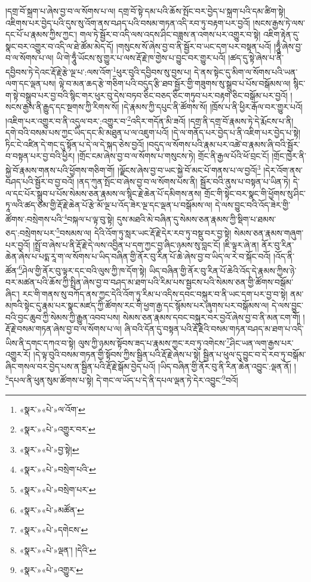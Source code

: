 །དགྲ་བོ་སྐྲག་པ་ཞེས་བྱ་བ་ལ་སོགས་པ་ལ། དགྲ་བོ་སྟེ་དམ་པའི་ཆོས་སྤོང་བར་བྱེད་པ་སྐྲག་པའི་དམ་ཚིག་སྟེ། འཇིགས་པར་བྱེད་པའི་དུས་སུ་འོག་ནས་བཤད་པའི་བསམ་གཏན་འདི་རབ་ཏུ་བརྟག་པར་བྱའོ། །སངས་རྒྱས་ཏེ་ལས་དང་པོ་པ་རྣམས་ཀྱིས་ཀྱང་། གལ་ཏེ་སྦྱོར་བ་འདི་ལས་འདས་ཤིང་བཟླས་ན་འགས་པར་འགྱུར་བ་སྟེ། འཇིག་རྟེན་དུ་སྣང་བར་འགྱུར་བ་འདི་ལ་ཐེ་ཚོམ་མེད་དོ། །གསུངས་སོ་ཞེས་བྱ་བ་ནི་སྦྱོར་བ་ཡང་དག་པར་བསྟན་པའོ། །ཧཱུྃ་ཞེས་བྱ་བ་ལ་སོགས་པ་ལ། ཡི་གེ་ཧཱུྃ་ཡོངས་སུ་གྱུར་པ་ལས་རྡོ་རྗེ་ཁ་གྱེས་པ་བྱུང་བར་གྱུར་པའོ། །ཚད་དུ་སྟེ་ཞེས་པ་ནི་དབྱིབས་ཏེ་དེའང་རྡོ་རྗེ་རྩེ་ལྔ་པ་:ལས་འོག་\footnote{«སྣར་»«པེ་»ལ་འོག་}ཕུར་བུའི་དབྱིབས་སུ་བྱས་པ། དེ་ནས་སྟེང་དུ་མིག་ལ་སོགས་པའི་ཡན་ལག་དང་ལྡན་པས། ལྟེ་བ་མན་ཆད་རྩེ་གཅིག་པའི་བདུད་རྩི་ཐབ་སྦྱོར་གྱི་གཟུགས་སུ་སྒྲུབ་པ་པོས་བསྒོམས་ལ། སྙིང་ག་སྟེ་བསྒྲུབ་པར་བྱ་བའི་སྙིང་གར་ཕུར་བུ་དེས་བཏབ་ཅིང་བཅད་ཅིང་གཏུབ་པར་བརྟག་ཅིང་བསྒོམ་པར་བྱའོ། །སངས་རྒྱས་ནི་རྒྱུད་དང་སྔགས་ཀྱི་རིགས་སོ། །དེ་རྣམས་ཀྱི་དཔུང་ནི་ཚོགས་སོ། །ཁྲོས་པ་ནི་ཕྱིར་རྒོལ་བར་གྱུར་པའོ། །འཇིག་པར་འགྱུར་བ་ནི་འདུལ་བར་:འགྱུར་བ་\footnote{«སྣར་»«པེ་»འགྱུར་བར་}འདིར་གདོན་མི་ཟའོ། །དགྲ་ནི་དགྲ་བོ་རྣམས་ཏེ་དེ་རྨོངས་པ་ནི། དགེ་བའི་བསམ་པས་ཀྱང་ཡིད་དང་མི་མཐུན་པ་ལ་འཇུག་པའོ། །དེ་ལ་གནོད་པར་བྱེད་པ་ནི་འཇིག་པར་བྱེད་པ་སྟེ། ཏིང་ངེ་འཛིན་དེ་གང་དུ་སྟོན་པ་དེ་ལ་དེ་སྐད་ཅེས་བྱའོ། །བདུད་ལ་སོགས་པའི་རྣམ་པར་འཚེ་བ་རྣམས་ཞི་བའི་སྦྱོར་བ་བསྟན་པར་བྱ་བའི་ཕྱིར། །གྲོང་ངམ་ཞེས་བྱ་བ་ལ་སོགས་པ་གསུངས་ཏེ། གྲོང་ནི་རྒྱལ་པོའི་ཕོ་བྲང་ངོ། །གྲོང་ཁྱེར་ནི་སྐྱེ་བོ་རྣམས་གནས་པའི་ཕྱོགས་གཅིག་གོ། །ལྗོངས་ཞེས་བྱ་བ་ཡང་སྐྱེ་བོ་མང་པོ་གནས་པ་ལ་བྱའོ།\footnote{«སྣར་»«པེ་»བྱ་སྟེ།} །དེར་འོག་ནས་བཤད་པའི་སྦྱོར་བ་བྱ་བའོ། །ནད་ཀུན་སྤོང་བ་ཞེས་བྱ་བ་ལ་སོགས་པས་ནི། སྦྱོར་བའི་ནུས་པ་བསྟན་པ་ཡིན་ཏེ། དེ་ལ་དང་པོར་སྒྲུབ་པ་པོས་སེམས་ཅན་རྣམས་ལ་སྙིང་རྗེ་ཆེན་པོ་དམིགས་ནས། གྲོང་གི་སྟེང་བར་སྣང་གི་ཕྱོགས་སུ་ཤིང་ཏཱ་ལའི་ཚད་ཙམ་གྱི་རྡོ་རྗེ་ཆེན་པོ་རྩེ་མོ་ལྔ་པ་འོད་ཟེར་ལྔ་དང་ལྡན་པ་བསྒོམས་ལ། དེ་ལས་བྱུང་བའི་འོད་ཟེར་གྱི་ཚོགས་:བསྲེགས་པའི་\footnote{«སྣར་»«པེ་»བསྲེག་པའི་}བསྐལ་པ་ལྟ་བུ་སྟེ། དུས་མཐའི་མེ་བཞིན་དུ་སེམས་ཅན་རྣམས་ཀྱི་སྡིག་པ་ཐམས་ཅད་:བསྲེགས་པར་\footnote{«སྣར་»«པེ་»བསྲེག་པར་}བསམས་ལ། དེའི་འོག་ཏུ་སླར་ཡང་རྡོ་རྗེ་དེར་རབ་ཏུ་བསྡུ་བར་བྱ་སྟེ། སེམས་ཅན་རྣམས་གཞུག་པར་བྱའོ། །སྤྲོ་བ་ཞེས་པ་ནི་རྡོ་རྗེ་དེ་ལས་འབྱིན་པ་དག་ཀྱང་བྱ་ཞིང་ཉམས་སུ་བླང་ངོ། །ཇི་ལྟར་ཞེ་ན། ནོར་བུ་རིན་ཆེན་ཞེས་པ་པདྨ་རཱ་ག་ལ་སོགས་པ་ཡིད་བཞིན་གྱི་ནོར་བུ་རིན་པོ་ཆེ་ཞེས་བྱ་བ་ཡིད་ལ་རེ་བ་སྐོང་བའོ། །འོད་ནི་ཚོན་\footnote{«སྣར་»«པེ་»མཚོན་}ཤེལ་གྱི་ནོར་བུ་ལྟར་དང་བའི་ལུས་ཀྱི་ཁ་དོག་སྟེ། ཡིད་བཞིན་གྱི་ནོར་བུ་རིན་པོ་ཆེའི་འོད་དེ་རྣམས་ཀྱིས་ཉེ་བར་མཚན་པའི་ཆོས་ཀྱི་སྤྲིན་ཞེས་བྱ་བ་བཤད་མ་ཐག་པའི་རིམ་པས་སྦྱངས་པའི་སེམས་ཅན་གྱི་ཚོགས་བསྒོམ་ཞིང་། རང་གི་གནས་སུ་བཀོད་ནས་ཀྱང་དེའི་འོག་ཏུ་རིམ་པ་འདིས་དབང་བསྐུར་བ་ནི་ཡང་དག་པར་བྱ་བ་སྟེ། ནམ་མཁའི་སྟེང་དུ་རྣམ་པར་སྣང་མཛད་ཀྱི་ཚོགས་རང་གི་ཕྱག་རྒྱ་དང་སྙོམས་པར་ཞུགས་པར་བསྒོམས་ལ། དེ་ལས་བྱུང་བའི་བྱང་ཆུབ་ཀྱི་སེམས་ཀྱི་རྒྱུན་འབབ་པས། སེམས་ཅན་རྣམས་དབང་བསྐུར་བར་བྱའོ་ཞེས་བྱ་བ་ནི་མན་ངག་གོ། །རྡོ་རྗེ་བསམ་གཏན་ཞེས་བྱ་བ་ལ་སོགས་པ་ལ། ཞི་བའི་དོན་དུ་བསྟན་པའི་རྡོ་རྗེའི་བསམ་གཏན་བཤད་མ་ཐག་པ་འདི་ཡིས་ནི་དགང་དཀའ་བ་སྟེ། ལུས་ཀྱི་ཉམས་སྟོབས་ཟད་པ་རྣམས་ཀྱང་རབ་ཏུ་འགེངས་\footnote{«སྣར་»«པེ་»དགེངས་}ཤིང་ཡན་ལག་རྒྱས་པར་འགྱུར་རོ། །དེ་ལྟ་བུའི་བསམ་གཏན་གྱི་སྟོབས་ཀྱིས་སྦྱིན་པའི་རྡོ་རྗེ་ཞེས་པ་སྟེ། སྦྱིན་པ་ཕུལ་དུ་བྱུང་བ་དེ་རབ་ཏུ་བསྒོམ་ཞིང་གསལ་བར་བྱེད་པས་ན་སྦྱིན་པའི་རྡོ་རྗེ་སྒོམ་བྱེད་པའོ། །ཡིད་བཞིན་གྱི་ནོར་བུ་ནི་རིན་ཆེན་འབྱུང་:ལྡན་ནོ། །\footnote{«སྣར་»«པེ་»ལྡན་། །དེའི་}དཔལ་ནི་ཕུན་སུམ་ཚོགས་པ་སྟེ། དེ་གང་ལ་ཡོད་པ་དེ་ནི་དཔལ་ལྡན་ཏེ་དེར་འབྱུང་\footnote{«སྣར་»«པེ་»འགྱུར་}བའོ། 